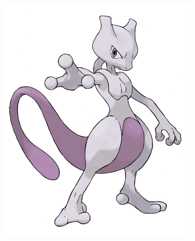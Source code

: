 \documentclass{beamer}
\begin{document}
\begin{frame}[plain]
\begin{columns}
\begin{column}{0.3\linewidth}
\begin{figure}
\begin{center}
					\includegraphics[width=\textwidth]{slides/images/mewtwo.png}
				\end{center}
			\end{figure}
		\end{column}
	\end{columns}
\end{frame}
\end{document}
